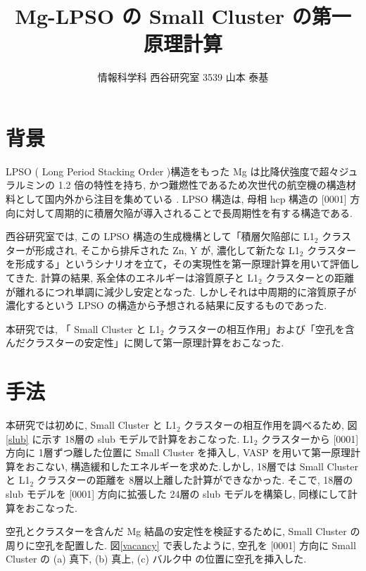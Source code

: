 \documentclass[a4j,twocolumn]{jsarticle}
\begin{document}
\title{Mg-LPSO の Small Cluster の第一原理計算}
\author{情報科学科 西谷研究室 3539 山本 泰基}
\date{}
\maketitle


\section{背景}
LPSO ( Long Period Stacking Order )構造をもった Mg は比降伏強度で超々ジュラルミンの 1.2 倍の特性を持ち, かつ難燃性であるため次世代の航空機の構造材料として国内外から注目を集めている \cite{Th}. LPSO 構造は, 母相 hcp 構造の [0001] 方向に対して周期的に積層欠陥が導入されることで長周期性を有する構造である.

西谷研究室では, この LPSO 構造の生成機構として「積層欠陥部に L1$_2$ クラスターが形成され, そこから排斥された Zn, Y が, 濃化して新たな L1$_2$ クラスターを形成する」というシナリオを立て，その実現性を第一原理計算を用いて評価してきた. 計算の結果, 系全体のエネルギーは溶質原子と L1$_2$ クラスターとの距離が離れるにつれ単調に減少し安定となった. しかしそれは中周期的に溶質原子が濃化するという LPSO の構造から予想される結果に反するものであった.

本研究では, 「 Small Cluster と L1$_2$ クラスターの相互作用」および「空孔を含んだクラスターの安定性」に関して第一原理計算をおこなった.


\section{手法}
本研究では初めに, Small Cluster と L1$_2$ クラスターの相互作用を調べるため, 図\ref{slub} に示す 18層の slub モデルで計算をおこなった. L1$_2$ クラスターから [0001] 方向に 1層ずつ離した位置に Small Cluster を挿入し, VASP を用いて第一原理計算をおこない, 構造緩和したエネルギーを求めた.しかし, 18層では Small Cluster と L1$_2$ クラスターの距離を 8層以上離した計算ができなかった. そこで, 18層の slub モデルを [0001] 方向に拡張した 24層の slub モデルを構築し, 同様にして計算をおこなった.

空孔とクラスターを含んだ Mg 結晶の安定性を検証するために, Small Cluster の周りに空孔を配置した. 図\ref{vacancy} で表したように, 空孔を [0001] 方向に Small Cluster の (a) 真下, (b) 真上, (c) バルク中 の位置に空孔を挿入した. 
\end{document}
